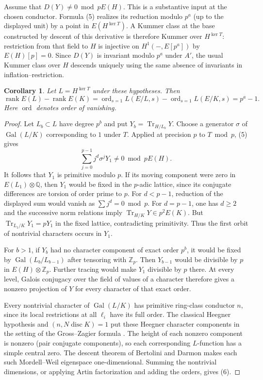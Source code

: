 \documentclass[11pt]{article}
\newtheorem{corollary}[theorem]{Corollary}
\newcommand{\Z}{\mathbb Z}
\newcommand{\Q}{\mathbb Q}
\newcommand{\Gal}{\operatorname{Gal}}
\newcommand{\rank}{\operatorname{rank}}
\newcommand{\Tr}{\operatorname{Tr}}
\newcommand{\ord}{\operatorname{ord}}
\begin{document}
Assume that $D(Y)\ne0\bmod pE(H)$. This is a substantive input at
the chosen conductor. Formula (5) realizes its reduction modulo
$p^a$ (up to the displayed unit) by a point in $E(H^{\ker T})$.
A Kummer class at the base constructed by descent of this derivative
is therefore Kummer over $H^{\ker T}$: restriction from that field
to $H$ is injective on $H^1(-,E[p^a])$ by $E(H)[p]=0$. Since
$D(Y)$ is invariant modulo $p^a$ under $A'$, the usual Kummer
class over $H$ descends uniquely using the same absence of
invariants in inflation--restriction.

\begin{corollary}\label{cor:relative}
Let $L=H^{\ker T}$ under these hypotheses. Then
\[
 \rank E(L)-\rank E(K)
 =\ord_{s=1}L(E/L,s)-\ord_{s=1}L(E/K,s)=p^a-1 .
 \tag{6}
\]
Here $\ord$ denotes order of vanishing.
\end{corollary}
\begin{proof}
Let $L_b\subset L$ have degree $p^b$ and put $Y_b=\Tr_{H/L_b}Y$.
Choose a generator $\sigma$ of $\Gal(L/K)$ corresponding to $1$
under $T$. Applied at precision $p$ to $T\bmod p$, (5) gives
\[
 \sum_{j=0}^{p-1}j^d\sigma^jY_1\ne0\bmod pE(H).
\]
It follows that $Y_1$ is primitive modulo $p$. If its moving
component were zero in $E(L_1)\otimes\Q$, then $Y_1$ would be fixed
in the $p$-adic lattice, since its conjugate differences are torsion
of order prime to $p$. For $d<p-1$, reduction of the displayed sum
would vanish as $\sum j^d=0\bmod p$. For $d=p-1$, one has $d\ge2$
and the successive norm relations imply $\Tr_{H/K}Y\in p^2 E(K)$.
But $\Tr_{L_1/K}Y_1=pY_1$ in the fixed lattice, contradicting
primitivity. Thus the first orbit of nontrivial characters occurs in $Y_1$.

For $b>1$, if $Y_b$ had no character component of exact order $p^b$,
it would be fixed by $\Gal(L_b/L_{b-1})$ after tensoring with $\Z_p$.
Then $Y_{b-1}$ would be divisible by $p$ in $E(H)\otimes\Z_p$.
Further tracing would make $Y_1$ divisible by $p$ there.
At every level, Galois conjugacy over the field of values of a
character therefore gives a nonzero projection of $Y$ for every
character of that exact order.

Every nontrivial character of $\Gal(L/K)$ has primitive ring-class
conductor $n$, since its local restrictions at all $\ell_i$ have its
full order. The classical Heegner hypothesis and
$(n,N\operatorname{disc}K)=1$ put these Heegner character components
in the setting of the Gross--Zagier formula \cite[Thm.~1.1]{CST}.
The height of each nonzero component is nonzero (pair conjugate
components), so each corresponding $L$-function has a simple
central zero. The descent theorem of Bertolini and Darmon
\cite[\S\S1--2]{BD} makes each such Mordell--Weil eigenspace
one-dimensional. Summing the nontrivial dimensions, or applying
Artin factorization and adding the orders, gives (6).
\end{proof}
\end{document}
